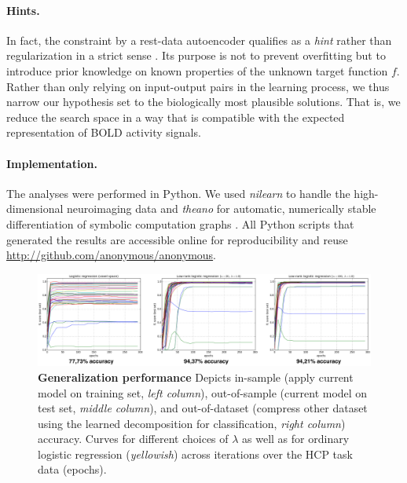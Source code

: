 \documentclass{article} %
\begin{document}
\paragraph{Hints.}
In fact, the constraint by a rest-data autoencoder qualifies as a
\textit{hint}
rather than regularization in a strict sense \cite{abu1994hints}.
Its purpose is not to prevent overfitting but to introduce
prior knowledge on known properties of the unknown target function $f$.
Rather than only relying on input-output pairs in the learning process,
we thus narrow our hypothesis set to the biologically most plausible solutions.
That is, we reduce the search space in a way that
is compatible with the expected representation of BOLD activity signals.

\paragraph{Implementation.}
The analyses were performed in Python.
We used \textit{nilearn} to handle
the high-dimensional neuroimaging data 
\cite{abrah14}
and
\textit{theano} for automatic, numerically stable
differentiation of symbolic computation graphs
\cite{bastien2012theano, bergstra2010theano}.
All Python scripts that generated the results are
accessible online for reproducibility and reuse
\url{http://github.com/anonymous/anonymous}.

\bigskip

\begin{figure}
\begin{centering}
\includegraphics[width=1.00\textwidth]{figures/accuracies.png}
\end{centering}
\caption{\textbf{Generalization performance}
Depicts in-sample (apply current model on training set, \textit{left column}),
out-of-sample (current model on test set, \textit{middle column}),
and out-of-dataset (compress other dataset using the
learned decomposition for classification, \textit{right column}) accuracy.
Curves for different choices of $\lambda$ as well as for ordinary
logistic regression (\textit{yellowish})
across iterations over the HCP task data (epochs).
}
\end{figure}
\end{document}
